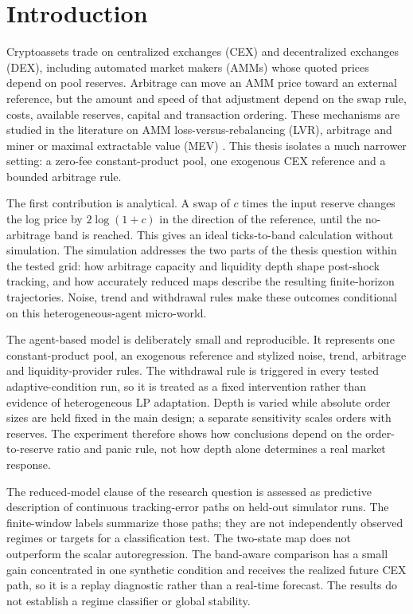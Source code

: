 \chapter{Introduction}
\label{cap:introduccion}

Cryptoassets trade on centralized exchanges (CEX) and decentralized exchanges (DEX), including automated market makers (AMMs) whose quoted prices depend on pool reserves. Arbitrage can move an AMM price toward an external reference, but the amount and speed of that adjustment depend on the swap rule, costs, available reserves, capital and transaction ordering. These mechanisms are studied in the literature on AMM loss-versus-rebalancing (LVR), arbitrage and miner or maximal extractable value (MEV) \cite{milionis2022lvr,daian2020flash,zhou2021hft}. This thesis isolates a much narrower setting: a zero-fee constant-product pool, one exogenous CEX reference and a bounded arbitrage rule.

The first contribution is analytical. A swap of $c$ times the input reserve changes the log price by $2\log(1+c)$ in the direction of the reference, until the no-arbitrage band is reached. This gives an ideal ticks-to-band calculation without simulation. The simulation addresses the two parts of the thesis question within the tested grid: how arbitrage capacity and liquidity depth shape post-shock tracking, and how accurately reduced maps describe the resulting finite-horizon trajectories. Noise, trend and withdrawal rules make these outcomes conditional on this heterogeneous-agent micro-world.

The agent-based model is deliberately small and reproducible. It represents one constant-product pool, an exogenous reference and stylized noise, trend, arbitrage and liquidity-provider rules. The withdrawal rule is triggered in every tested adaptive-condition run, so it is treated as a fixed intervention rather than evidence of heterogeneous LP adaptation. Depth is varied while absolute order sizes are held fixed in the main design; a separate sensitivity scales orders with reserves. The experiment therefore shows how conclusions depend on the order-to-reserve ratio and panic rule, not how depth alone determines a real market response.

The reduced-model clause of the research question is assessed as predictive description of continuous tracking-error paths on held-out simulator runs. The finite-window labels summarize those paths; they are not independently observed regimes or targets for a classification test. The two-state map does not outperform the scalar autoregression. The band-aware comparison has a small gain concentrated in one synthetic condition and receives the realized future CEX path, so it is a replay diagnostic rather than a real-time forecast. The results do not establish a regime classifier or global stability.

